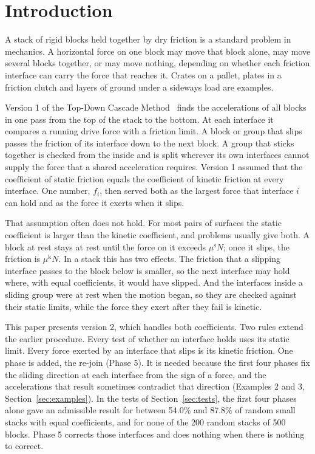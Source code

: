 \documentclass[11pt,a4paper]{article}
\newcommand{\mus}{\mu^{\mathrm{s}}}
\newcommand{\muk}{\mu^{\mathrm{k}}}
\begin{document}
\section{Introduction}

A stack of rigid blocks held together by dry friction is a standard problem in mechanics. A horizontal force on one block may move that block alone, may move several blocks together, or may move nothing, depending on whether each friction interface can carry the force that reaches it. Crates on a pallet, plates in a friction clutch and layers of ground under a sideways load are examples.

Version 1 of the Top-Down Cascade Method~\cite{singh1} finds the accelerations of all blocks in one pass from the top of the stack to the bottom. At each interface it compares a running drive force with a friction limit. A block or group that slips passes the friction of its interface down to the next block. A group that sticks together is checked from the inside and is split wherever its own interfaces cannot supply the force that a shared acceleration requires. Version 1 assumed that the coefficient of static friction equals the coefficient of kinetic friction at every interface. One number, $f_i$, then served both as the largest force that interface $i$ can hold and as the force it exerts when it slips.

That assumption often does not hold. For most pairs of surfaces the static coefficient is larger than the kinetic coefficient, and problems usually give both. A block at rest stays at rest until the force on it exceeds $\mus N$; once it slips, the friction is $\muk N$. In a stack this has two effects. The friction that a slipping interface passes to the block below is smaller, so the next interface may hold where, with equal coefficients, it would have slipped. And the interfaces inside a sliding group were at rest when the motion began, so they are checked against their static limits, while the force they exert after they fail is kinetic.

This paper presents version 2, which handles both coefficients. Two rules extend the earlier procedure. Every test of whether an interface holds uses its static limit. Every force exerted by an interface that slips is its kinetic friction. One phase is added, the re-join (Phase 5). It is needed because the first four phases fix the sliding direction at each interface from the sign of a force, and the accelerations that result sometimes contradict that direction (Examples 2 and 3, Section~\ref{sec:examples}). In the tests of Section~\ref{sec:tests}, the first four phases alone gave an admissible result for between 54.0\% and 87.8\% of random small stacks with equal coefficients, and for none of the 200 random stacks of 500 blocks. Phase 5 corrects those interfaces and does nothing when there is nothing to correct.
\end{document}
